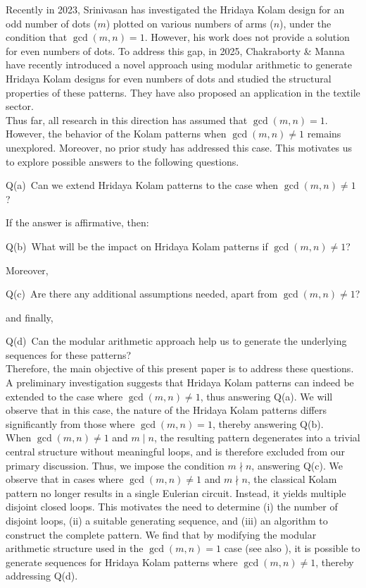 \documentclass[12pt,a4paper]{article}
\theoremstyle{remark} %
\theoremstyle{example} %
\theoremstyle{proposition}
\begin{document}
\noindent Recently in 2023, \noindent Srinivasan \cite{SRINIVASAN} has investigated the Hridaya Kolam design for an odd number of dots ($m$) plotted on various numbers of arms ($n$), under the condition that $\gcd(m, n) = 1$. However, his work does not provide a solution for even numbers of dots. To address this gap, in 2025, Chakraborty \& Manna \cite{CHAKMAN} have recently introduced a novel approach using modular arithmetic to generate Hridaya Kolam designs for even numbers of dots and studied the structural properties of these patterns. They have also proposed an application in the textile sector.\\


\noindent Thus far, all research in this direction has assumed that $\gcd(m, n) = 1$. 
However, the behavior of the Kolam patterns when $\gcd(m, n) \neq 1$ remains unexplored. 
Moreover, no prior study has addressed this case. 
This motivates us to explore possible answers to the following questions.

\medskip
\textsf{Q(a)}~Can we extend Hridaya Kolam patterns to the case when $\gcd(m, n) \neq 1$?

\medskip
If the answer is affirmative, then:

\medskip
\textsf{Q(b)}~What will be the impact on Hridaya Kolam patterns if $\gcd(m, n) \neq 1$?

\medskip
Moreover,

\medskip
\textsf{Q(c)}~Are there any additional assumptions needed, apart from $\gcd(m, n) \neq 1$?

\medskip
and finally,

\medskip
\textsf{Q(d)}~Can the modular arithmetic approach help us to generate the underlying sequences for these patterns?\\

\noindent Therefore, the main objective of this present paper is to address these questions. A preliminary investigation suggests that Hridaya Kolam patterns can indeed be extended to the case where $\gcd(m, n) \neq 1$, thus answering Q(a). We will observe that in this case, the nature of the Hridaya Kolam patterns differs significantly from those where $\gcd(m, n) = 1$, thereby answering Q(b).\\

\noindent When $\gcd(m, n) \neq 1$ and $m \mid n$, the resulting pattern degenerates into a trivial central structure without meaningful loops, and is therefore excluded from our primary discussion. Thus, we impose the condition $m \nmid n$, answering Q(c). We observe that in cases where $\gcd(m, n) \neq 1$ and $m \nmid n$, the classical Kolam pattern no longer results in a single Eulerian circuit. Instead, it yields multiple disjoint closed loops. This motivates the need to determine (i) the number of disjoint loops, (ii) a suitable generating sequence, and (iii) an algorithm to construct the complete pattern. We find that by modifying the modular arithmetic structure used in the $\gcd(m, n) = 1$ case (see also \cite{CHAKMAN}), it is possible to generate sequences for Hridaya Kolam patterns where $\gcd(m, n) \neq 1$, thereby addressing Q(d).
\end{document}
